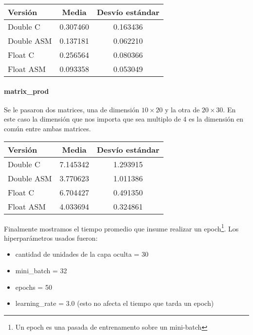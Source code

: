 \begin{center}
    \begin{tabular}{| l | c | c |}
                \hline
    Versión & Media & Desvío estándar \\
                \hline
    Double C & 0.307460 & 0.163436 \\
    Double ASM & 0.137181 & 0.062210 \\
    Float C & 0.256564 & 0.080366 \\
    Float ASM  & 0.093358 & 0.053049 \\
                \hline
            
        \end{tabular}
\end{center}

\paragraph{matrix\_prod}

Se le pasaron dos matrices, una de dimensión $10\times 20$ y la otra de $20\times 30$. En este caso la dimensión que nos importa que sea multiplo de 4 es la dimensión en común entre ambas matrices.

\begin{center}
    \begin{tabular}{| l | c | c |}
                \hline
    Versión & Media & Desvío estándar \\
                \hline
    Double C & 7.145342 & 1.293915 \\
    Double ASM & 3.770623 & 1.011386 \\
    Float C & 6.704427 & 0.491350 \\
    Float ASM  & 4.033694 & 0.324861 \\
                \hline
            
        \end{tabular}
\end{center}


Finalmente mostramos el tiempo promedio que insume realizar un epoch\footnote{Un epoch es una pasada de entrenamento sobre un mini-batch}. Los hiperparámetros usados fueron:
\begin{itemize}
    \item cantidad de unidades de la capa oculta = 30
    \item mini\_batch = 32
    \item epochs = 50
    \item learning\_rate = 3.0 (esto no afecta el tiempo que tarda un epoch)
\end{itemize}

